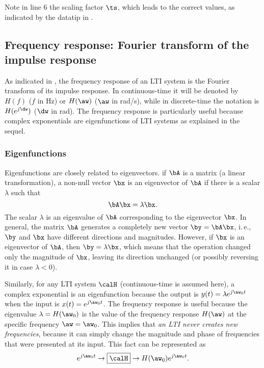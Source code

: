 

Note in line 6
the scaling factor $\ts$, which leads to the correct values, as indicated
by the datatip in .
\eExample 

\subsection{Frequency response: Fourier transform of the impulse response}

As indicated in , the frequency response of an LTI system is the Fourier transform of its impulse response. In continuous-time it will be denoted by $H(f)$ ($f$ in Hz) or $H(\aw)$ ($\aw$ in rad/s), while in discrete-time the notation is $H(e^{j\dw})$ ($\dw$ in rad). The frequency response is particularly useful because complex exponentials are eigenfunctions of LTI systems as explained in the sequel.

\subsubsection{Eigenfunctions}

Eigenfunctions are closely related to eigenvectors.
 if $\bA$ is a matrix (a linear transformation), a non-null vector $\bx$ is an eigenvector of $\bA$ if there is a scalar $\lambda$ such that
\[
\bA \bx = \lambda \bx.
\]
The scalar $\lambda$ is an eigenvalue of $\bA$ corresponding to the eigenvector $\bx$.
In general, the matrix $\bA$ generates a completely new vector $\by=\bA \bx$, i.\,e., $\by$ and $\bx$ have different directions and magnitudes.
However, if $\bx$ is an eigenvector of $\bA$, then $\by= \lambda \bx$, which means that the operation changed only the magnitude of $\bx$, leaving its direction unchanged (or possibly reversing it in case $\lambda < 0$).

Similarly, for any LTI system $\calH$ (continuous-time is assumed here), a complex exponential is an eigenfunction because the output is $y(t) = \lambda e^{j \aw_0 t}$ when the input is $x(t)=e^{j \aw_0 t}$. The frequency response is useful because the eigenvalue $\lambda = H(\aw_0)$ is the value of the frequency response $H(\aw)$ at the specific frequency $\aw = \aw_0$.
This implies that \emph{an LTI never creates new frequencies}, because it can simply change the magnitude and phase of frequencies that were presented at its input. This fact can be represented as
\[
e^{j \aw_0 t} \rightarrow\boxed{\calH}\rightarrow H(\aw_0) e^{j \aw_0 t}.
\]

